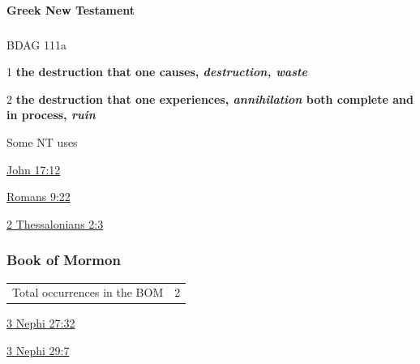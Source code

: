 		\paragraph{Greek New Testament} %
			\label{SONSOFPERDITION-GREEK}
		
			\subparagraph{\texorpdfstring{}{}}
				\label{APOLEIA}
			
				\begin{compactdesc}
					\item[BDAG 111a] \textbf{}
						\begin{compactitem}
							\item[1] \textbf{the destruction that one causes, \textit{destruction, waste}}
							\item[2] \textbf{the destruction that one experiences, \textit{annihilation} both complete and in process, \textit{ruin}}
						\end{compactitem}
				\end{compactdesc}
				
				\begin{compactdesc}
					\item[Some NT uses] \textbf{}
						\begin{compactdesc}
							\item[{\hyperref[JOHN-17-12]{John 17:12}}]
							\item[{\hyperref[ROMANS-9-22]{Romans 9:22}}]
							\item[{\hyperref[2THESSALONIANS-2-3]{2 Thessalonians 2:3}}]
						\end{compactdesc}
				\end{compactdesc}
		
	\subsubsection{Book of Mormon} %
		\label{SONSOFPERDITION-BOM}
	
		\begin{tabular}{ll}
			Total occurrences in the BOM & 2
		\end{tabular}
		
		\begin{compactdesc}
			\item[{\hyperref[3NEPHI-27-32]{3 Nephi 27:32}}]
			\item[{\hyperref[3NEPHI-29-7]{3 Nephi 29:7}}]
		\end{compactdesc}
		
